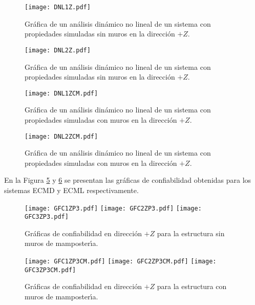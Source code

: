 \begin{figure} [htbp]
\texttt{[image: DNL1Z.pdf]}
\caption{Gr\'afica de un an\'alisis din\'amico no lineal de un sistema con propiedades simuladas sin muros en la direcci\'on $+Z$.}
\label{fig:apu27}
\end{figure}

\begin{figure} [htbp]
\texttt{[image: DNL2Z.pdf]}
\caption{Gr\'afica de un an\'alisis din\'amico no lineal de un sistema con propiedades simuladas sin muros en la direcci\'on $+Z$.}
\label{fig:apu28}
\end{figure}

\begin{figure} [htbp]
\texttt{[image: DNL1ZCM.pdf]}
\caption{Gr\'afica de un an\'alisis din\'amico no lineal de un sistema con propiedades simuladas con muros en la direcci\'on $+Z$.}
\label{fig:apu29}
\end{figure}

\begin{figure} [htbp]
\texttt{[image: DNL2ZCM.pdf]}
\caption{Gr\'afica de un an\'alisis din\'amico no lineal de un sistema con propiedades simuladas con muros en la direcci\'on $+Z$.}
\label{fig:apu30}
\end{figure}

En la Figura \ref{fig:apu31} y \ref{fig:apu32} se presentan las gr\'aficas de confiabilidad obtenidas para los sistemas ECMD y ECML respectivamente.

\newpage

\begin{figure} [htbp]
\centering
\texttt{[image: GFC1ZP3.pdf]}
\texttt{[image: GFC2ZP3.pdf]}
\texttt{[image: GFC3ZP3.pdf]}
\caption{Gr\'aficas de confiabilidad en direcci\'on $+Z$ para la estructura sin muros de mamposter\'{\i}a.}
\label{fig:apu31}
\end{figure}

\begin{figure} [htbp]
\centering
\texttt{[image: GFC1ZP3CM.pdf]}
\texttt{[image: GFC2ZP3CM.pdf]}
\texttt{[image: GFC3ZP3CM.pdf]}
\caption{Gr\'aficas de confiabilidad en direcci\'on $+Z$ para la estructura con muros de mamposter\'{\i}a.}
\label{fig:apu32}
\end{figure}

\paragraph{}

